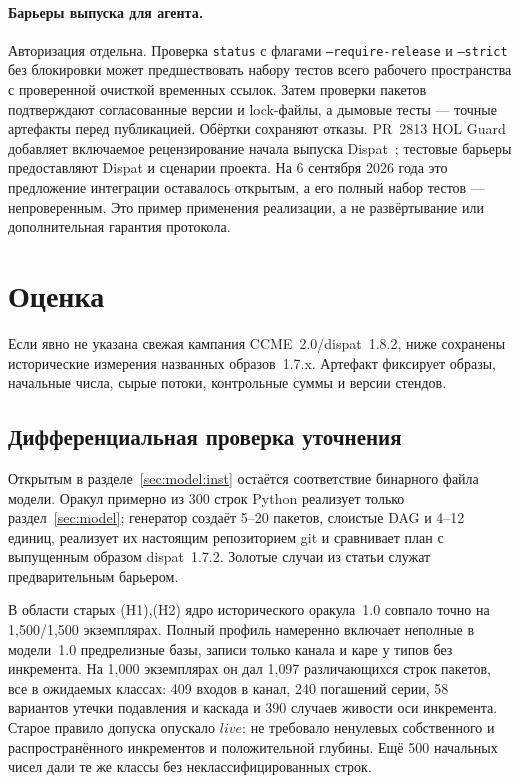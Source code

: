 \documentclass[sigconf,nonacm]{acmart}
\theoremstyle{acmplain}
\theoremstyle{acmdefinition}
\theoremstyle{acmplain}
\newcommand{\code}[1]{\texttt{#1}}
\begin{document}
\paragraph{Барьеры выпуска для агента.} Авторизация отдельна. Проверка
\code{status} с флагами \code{--require-release} и \code{--strict}
без блокировки может
предшествовать набору тестов всего рабочего пространства с проверенной
очисткой временных ссылок. Затем проверки пакетов подтверждают согласованные
версии и lock-файлы, а дымовые тесты --- точные артефакты перед публикацией.
Обёртки сохраняют отказы.
PR~2813 HOL Guard добавляет включаемое рецензирование начала выпуска
Dispat~\cite{guard}; тестовые барьеры предоставляют Dispat и сценарии проекта.
На 6 сентября 2026 года это предложение интеграции оставалось открытым, а его
полный набор тестов --- непроверенным. Это пример применения реализации, а не
развёртывание или дополнительная гарантия протокола.
\section{Оценка}
\label{sec:eval}

Если явно не указана свежая кампания CCME~2.0/dispat~1.8.2, ниже сохранены
исторические измерения названных образов~1.7.x. Артефакт фиксирует образы,
начальные числа, сырые потоки, контрольные суммы и версии стендов.

\subsection{Дифференциальная проверка уточнения}
\label{sec:eval:diff}

Открытым в разделе~\ref{sec:model:inst} остаётся соответствие бинарного файла
модели. Оракул примерно из 300 строк Python реализует только
раздел~\ref{sec:model}; генератор создаёт 5--20 пакетов, слоистые DAG и 4--12
единиц, реализует их настоящим репозиторием git и сравнивает план с выпущенным
образом dispat~1.7.2. Золотые случаи из статьи служат предварительным барьером.

В области старых (H1),(H2) ядро исторического оракула~1.0 совпало точно на
1{,}500/1{,}500 экземплярах. Полный профиль намеренно включает неполные в
модели~1.0 предрелизные базы, записи только канала и каре у типов без
инкремента. На 1{,}000 экземплярах он дал 1{,}097 различающихся строк пакетов,
все в ожидаемых классах: 409 входов в канал, 240 погашений серии, 58 вариантов
утечки подавления и каскада и 390 случаев живости оси инкремента. Старое
правило допуска опускало $\mathit{live}$: не требовало ненулевых собственного и
распространённого инкрементов и положительной глубины. Ещё 500 начальных чисел
дали те же классы без неклассифицированных строк.
\end{document}
